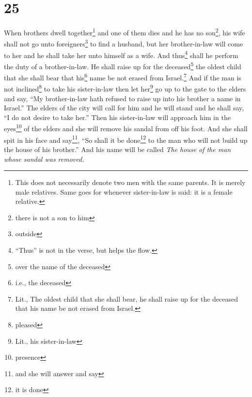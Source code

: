 \section{25}\label{Deuteronomy 25}
\begin{enumerate}[align=center]
     When brothers dwell together\footnote{This does not necessarily denote two men with the same parents. It is merely male relatives. Same goes for whenever sister-in-law is said: it is a female relative.} and one of them dies and he has no son\footnote{there is not a son to him}, his wife shall not go unto foreigners\footnote{outside} to find a husband, but her brother-in-law will come to her and he shall take her unto himself as a wife. And thus\footnote{``Thus'' is not in the verse, but helps the flow.} shall he perform the duty of a brother-in-law.%
     He shall raise up for the deceased\footnote{over the name of the deceased} the oldest child that she shall bear that his\footnote{i.e., the deceased} name be not erased from Israel.\footnote{Lit., The oldest child that she shall bear, he shall raise up for the deceased that his name be not erased from Israel.}%
     And if the man is not inclined\footnote{pleased} to take his sister-in-law then let her\footnote{Lit., his sister-in-law} go up to the gate to the elders and say, ``My brother-in-law hath refused to raise up into his brother a name in Israel.''%
     The elders of the city will call for him and he will stand and he shall say, ``I do not desire to take her.''%
     Then his sister-in-law will approach him in the eyes\footnote{presence} of the elders and she will remove his sandal from off his foot. And she shall spit in his face and say\footnote{and she will answer and say}, ``So shall it be done\footnote{it is done} to the man who will not build up the house of his brother.''%
     And his name will be called \emph{The house of the man whose sandal was removed.}%
\end{enumerate}

